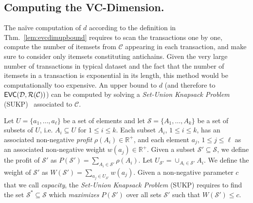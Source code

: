 \subsection{Computing the VC-Dimension.}
The na\"ive computation of $d$  according to the definition in Thm.~\ref{lem:evcdimupbound}
requires to scan the transactions one by one, 
compute the number of itemsets from $\mathcal{C}$ appearing in each
transaction, and make sure to consider only itemsets constituting antichains. Given the very large
number of transactions in typical dataset and the fact that the number of
itemsets in a transaction is exponential in its length, this method would be
computationally too expensive. An upper bound to $d$ (and therefore to
$\mathsf{EVC}({\cal D},\mathcal{R}(\mathcal{C}))$) can be computed by solving a
\emph{Set-Union Knapsack Problem} (SUKP)~\citep{GoldschmidtNY94} associated to
$\mathcal{C}$.

\begin{definition}\label{def:sukp}
  Let $U=\{a_1,\dotsc,a_\ell\}$ be a set of elements and let
  $\mathcal{S}=\{A_1,\dotsc,A_k\}$ be a set of subsets of $U$, i.e.
  $A_i\subseteq U$ for $1\le i\le k$. Each subset $A_i$, $1\le i\le k$, has an associated
  non-negative \emph{profit} $\rho(A_i)\in\mathbb{R}^+$, and each element $a_j$, $1\le
  j\le\ell$ as an associated non-negative weight $w(a_j)\in\mathbb{R}^+$.
  Given a subset $\mathcal{S}'\subseteq\mathcal{S}$, we define the profit of
  $\mathcal{S}'$ as $P(\mathcal{S}')=\sum_{A_i\in \mathcal{S}'}\rho(A_i)$. Let
  $U_{\mathcal{S}'}=\cup_{A_i\in\mathcal{S}'} A_i$. We
  define the weight of $\mathcal{S}'$ as $W(\mathcal{S}')=\sum_{a_j\in
  U_{\mathcal{S}'}} w(a_j)$. Given a non-negative parameter $c$ that we call
  \emph{capacity}, the \emph{Set-Union Knapsack Problem} (SUKP) requires to find
  the set $\mathcal{S}^*\subseteq\mathcal{S}$ which \emph{maximizes}
  $P(\mathcal{S}')$ over all sets $\mathcal{S}'$ such that $W(\mathcal{S}')\le c$.
\end{definition}

